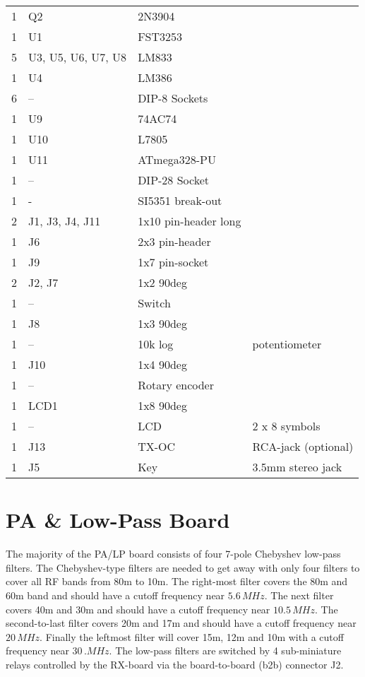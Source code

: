 \documentclass[10pt, a4paper]{scrartcl}
\begin{document}
\begin{longtable}{|l|p{6cm}|l|l|}
1 & Q2 & 2N3904 & \\
1 & U1 & FST3253 & \\
5 & U3, U5, U6, U7, U8 & LM833 & \\
1 & U4 & LM386 & \\ 
6 & -- & DIP-8 Sockets & \\
1 & U9 & 74AC74 & \\
1 & U10 & L7805 & \\
1 & U11 & ATmega328-PU & \\
1 & --  & DIP-28 Socket & \\
1 & - & SI5351 break-out & \\
2 & J1, J3, J4, J11 & 1x10 pin-header long & \\
1 & J6 & 2x3 pin-header & \\
1 & J9 & 1x7 pin-socket & \\
2 & J2, J7 & 1x2 90deg & \\
1 & -- & Switch & \\
1 & J8 & 1x3 90deg & \\
1 & -- & 10k log & potentiometer \\
1 & J10 & 1x4 90deg & \\
1 & -- & Rotary encoder & \\
1 & LCD1 & 1x8 90deg & \\
1 & -- & LCD & 2 x 8 symbols \\
1 & J13 & TX-OC & RCA-jack (optional) \\
1 & J5 & Key & 3.5mm stereo jack\\ \hline
\end{longtable}

\clearpage
\section{PA \& Low-Pass Board} \label{sec:pa}
The majority of the PA/LP board consists of four 7-pole Chebyshev low-pass filters. The Chebyshev-type filters are needed to get away with only four filters to cover all RF bands from 80m to 10m. The right-most filter covers the 80m and 60m band and should have a cutoff frequency near $5.6\,MHz$. The next filter covers 40m and 30m and should have a cutoff frequency near $10.5\,MHz$. The second-to-last filter covers 20m and 17m and should have a cutoff frequency near $20\,MHz$. Finally the leftmost filter will cover 15m, 12m and 10m with a cutoff frequency near $30\,.MHz$. The low-pass filters are switched by 4 sub-miniature relays controlled by the RX-board via the board-to-board (b2b) connector J2.
\end{document}
